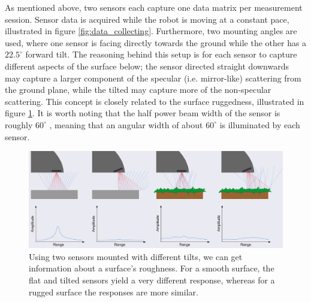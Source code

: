 As mentioned above, two sensors each capture one data matrix per measurement session. Sensor data is acquired while the robot is moving at a constant pace, illustrated in figure \ref{fig:data_collecting}. Furthermore, two mounting angles are used, where one sensor is facing directly towards the ground while the other has a $22.5^\circ$ forward tilt. The reasoning behind this setup is for each sensor to capture different aspects of the surface below; the sensor directed straight downwards may capture a larger component of the specular (i.e. mirror-like) scattering from the ground plane, while the tilted may capture more of the non-specular scattering. This concept is closely related to the surface ruggedness, illustrated in figure \ref{fig:reflections}. It is worth noting that the half power beam width of the sensor is roughly $60^\circ$ \citep{acconeer_datasheet_a111}, meaning that an angular width of about $60^\circ$ is illuminated by each sensor.

\begin{figure}[h]
	\centering
	\includegraphics[scale=0.9]{figs_temp/reflections.jpg}
	\caption{Using two sensors mounted with different tilts, we can get information about a surface's roughness. For a smooth surface, the flat and tilted sensors yield a very different response, whereas for a rugged surface the responses are more similar.}
	\label{fig:reflections}
\end{figure}

